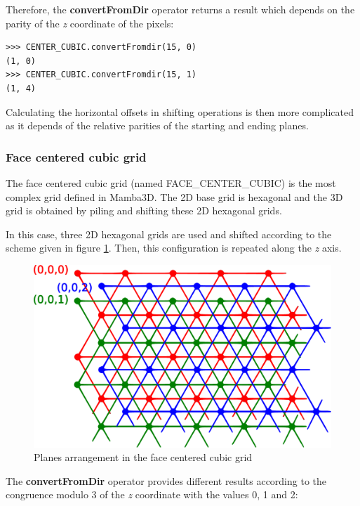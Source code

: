 \documentclass[a4paper,10pt,oneside]{article}
\begin{document}
Therefore, the \textbf{convertFromDir} operator returns a result which depends on the parity of the \emph{z} coordinate of the pixels:

\lstset{language=Python}
\begin{lstlisting}
>>> CENTER_CUBIC.convertFromdir(15, 0)
(1, 0)
>>> CENTER_CUBIC.convertFromdir(15, 1)
(1, 4)
\end{lstlisting}

Calculating the horizontal offsets in shifting operations is then more complicated as it depends of the relative parities
of the starting and ending planes.

\subsubsection{Face centered cubic grid}
\label{cha:FCCgrid}
The face centered cubic grid (named FACE\_CENTER\_CUBIC) is the most complex grid defined in Mamba3D. The 2D base grid is hexagonal
and the 3D grid is obtained by piling and shifting these 2D hexagonal grids.

In this case, three 2D hexagonal grids are used and shifted according to the scheme given in figure \ref{fig:FCC_grid}. Then, this configuration
is repeated along the \emph{z} axis.

\begin{figure}
\centering
\includegraphics[scale=0.5]{figures/FCC_grid.pdf}
\caption{Planes arrangement in the face centered cubic grid}
\label{fig:FCC_grid}
\end{figure}

The \textbf{convertFromDir} operator provides different results according to the congruence modulo 3 of the \emph{z} coordinate with the values
0, 1 and 2:
\end{document}
